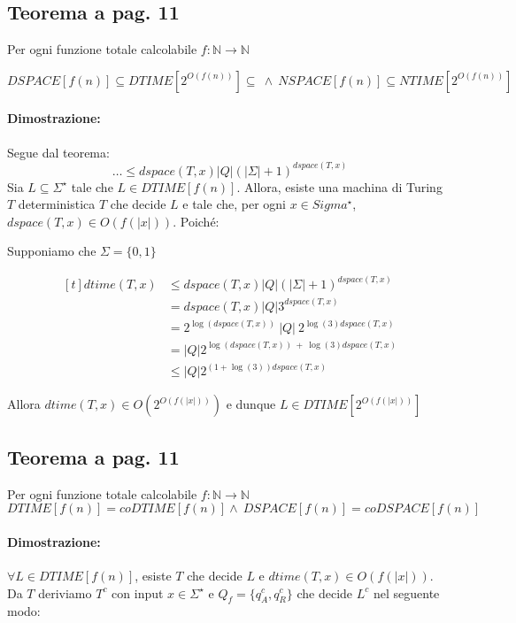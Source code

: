 \subsection{Teorema a pag. 11}

Per ogni funzione totale calcolabile $f: \mathbb{N} \rightarrow \mathbb{N}$ 

$$DSPACE[f(n)] \subseteq DTIME[2^{O(f(n))}] \subseteq\ \land\ NSPACE[f(n)] \subseteq NTIME[2^{O(f(n))}]$$

\paragraph*{Dimostrazione:} Segue dal teorema:
$$\dots \leq dspace(T, x)|Q|(|\Sigma| + 1)^{dspace(T, x)}$$
Sia $L \subseteq \Sigma^{\star}$ tale che $L \in DTIME[f(n)]$. Allora, esiste una machina di Turing $T$ deterministica $T$
che decide $L$ e tale che, per ogni $x \in Sigma^{\star}$, $dspace(T, x) \in O(f(|x|))$. Poiché:

Supponiamo che $\Sigma = \{0, 1\}$

\[
    \begin{aligned}[t]
    dtime(T, x) &\leq dspace(T, x)|Q|(|\Sigma| + 1)^{dspace(T, x)} \\
                 &= dspace(T, x)|Q|3^{dspace(T, x)}\\
                 &= 2^{\log(dspace(T,x))}\ |Q|\ 2^{\log(3)dspace(T, x)}\\
                 &= |Q|2^{\log(dspace(T,x))\ +\ \log(3)dspace(T, x)}\\
                 &\leq |Q|2^{(1 + \log(3))dspace(T, x)}
    \end{aligned}
\]

Allora $dtime(T, x)\in O(2^{O(f(|x|))})$ e dunque $L\in DTIME[2^{O(f(|x|))}]$

\subsection{Teorema a pag. 11}

Per ogni funzione totale calcolabile $f: \mathbb{N} \rightarrow \mathbb{N}$ 
$$DTIME[f(n)] = coDTIME[f(n)] \land\ DSPACE[f(n)] = coDSPACE[f(n)]$$

\paragraph*{Dimostrazione:} $\forall L \in DTIME[f(n)]$, esiste $T$ che decide $L$ e $dtime(T, x) \in O(f(|x|))$. 
Da $T$ deriviamo $T^{c}$ con input $x \in \Sigma^{\star}$ e $Q_{f} = \{q_{A}^{c}, q_{R}^{c}\}$ che decide $L^{c}$ nel seguente modo:

